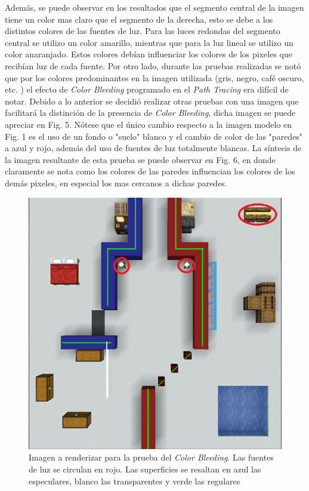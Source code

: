\documentclass[conference]{IEEEtran}
\begin{document}
Además, se puede observar en los resultados que el segmento central de la imagen tiene un color mas claro que el segmento de la derecha, esto se debe a los distintos colores de las fuentes de luz. Para las luces redondas del segmento central se utilizo un color amarillo, mientras que para la luz lineal se utilizo un color anaranjado. Estos colores debían influenciar los colores de los pixeles que recibían luz de cada fuente. Por otro lado, durante las pruebas realizadas se notó que por los colores predominantes en la imagen utilizada (gris, negro, café oscuro, etc. ) el efecto de \textit{Color Bleeding} programado en el \textit{Path Tracing} era difícil de notar. Debido a lo anterior se decidió realizar otras pruebas con una imagen que facilitará la distinción de la presencia de \textit{Color Bleeding}, dicha imagen se puede apreciar en Fig. 5. Nótese que el único cambio respecto a la imagen modelo en Fig. 1 es el uso de un fondo o "suelo" blanco y el cambio de color de las "paredes" a azul y rojo, además del uso de fuentes de luz totalmente blancas. La síntesis de la imagen resultante de esta prueba se puede observar en Fig. 6, en donde claramente se nota como los colores de las paredes influencian los colores de los demás pixeles, en especial los mas cercanos a dichas paredes. 

\begin{figure}[htbp]
\centerline{\includegraphics[scale=0.68]{Imagenes/Reference Image (Color Bleed).png}}
\caption{Imagen a renderizar para la prueba del \textit{Color Bleeding}. Las fuentes de luz se circulan en rojo. Las superficies se resaltan en azul las especulares, blanco las transparentes y verde las regulares}
\label{Imagen de referencia color bleeding}
\end{figure}
\end{document}
